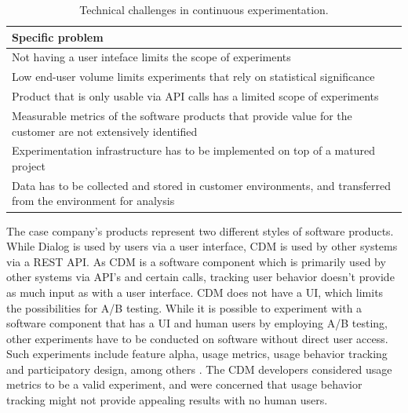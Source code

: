 \documentclass[english]{tktltiki2}
\theoremstyle{definition}
\theoremstyle{remark}
\begin{document}
\begin{center}
\begin{table}[htb]
    \begin{tabular}{ | p{12cm} |}
    \hline
    \textbf{Specific problem} \\ \hline
    Not having a user inteface limits the scope of experiments \\ \hline
    Low end-user volume limits experiments that rely on statistical significance \\ \hline 
	Product that is only usable via API calls has a limited scope of experiments \\ \hline
	Measurable metrics of the software products that provide value for the customer are not extensively identified  \\ \hline
	Experimentation infrastructure has to be implemented on top of a matured project \\ \hline
	Data has to be collected and stored in customer environments, and transferred from the environment for analysis \\ 
    \hline
    \end{tabular}
    \caption{Technical challenges in continuous experimentation.}
    \end{table}
\end{center}
The case company's products represent two different styles of software products. While Dialog is used by users via a user interface, CDM is used by other systems via a REST API. As CDM is a software component which is primarily used by other systems via API's and certain calls, tracking user behavior doesn't provide as much input as with a user interface. CDM does not have a UI, which limits the possibilities for A/B testing. While it is possible to experiment with a software component that has a UI and human users by employing A/B testing, other experiments have to be conducted on software without direct user access. Such experiments include feature alpha, usage metrics, usage behavior tracking and participatory design, among others \cite{bosch2012building}. The CDM developers considered usage metrics to be a valid experiment, and were concerned that usage behavior tracking might not provide appealing results with no human users.
\end{document}
